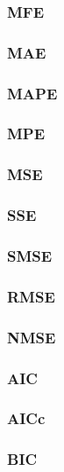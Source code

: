 \documentclass[
]{article}
\begin{document}
\subsubsection{MFE}

\subsubsection{MAE}

\subsubsection{MAPE}

\subsubsection{MPE}

\subsubsection{MSE}

\subsubsection{SSE}

\subsubsection{SMSE}

\subsubsection{RMSE}

\subsubsection{NMSE}

\subsubsection{AIC}

\subsubsection{AICc}

\subsubsection{BIC}
\end{document}
